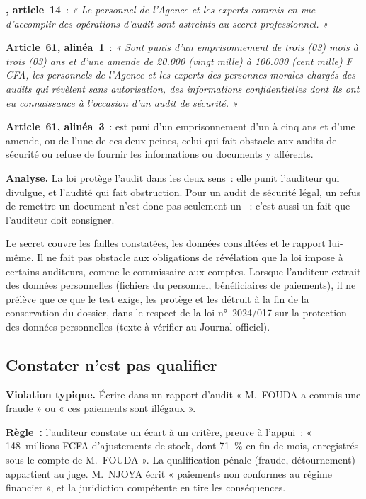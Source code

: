 \begin{boxjuris}
\textbf{, article~14}~: \textit{« Le personnel de
l'Agence et les experts commis en vue d'accomplir des opérations d'audit
sont astreints au secret professionnel. »}

\medskip
\textbf{Article~61, alinéa~1}~: \textit{« Sont punis d'un emprisonnement de
trois (03) mois à trois (03) ans et d'une amende de 20.000 (vingt mille) à
100.000 (cent mille) F CFA, les personnels de l'Agence et les experts des
personnes morales chargés des audits qui révèlent sans autorisation, des
informations confidentielles dont ils ont eu connaissance à l'occasion
d'un audit de sécurité. »}

\medskip
\textbf{Article~61, alinéa~3}~: est puni d'un emprisonnement d'un à cinq
ans et d'une amende, ou de l'une de ces deux peines, celui qui fait
obstacle aux audits de sécurité ou refuse de fournir les informations ou
documents y afférents.

\medskip
\textbf{Analyse.} La loi protège l'audit dans les deux sens~: elle punit
l'auditeur qui divulgue, et l'audité qui fait obstruction. Pour un audit
de sécurité légal, un refus de remettre un document n'est donc pas
seulement un \NEK{}~: c'est aussi un fait que l'auditeur doit consigner.
\end{boxjuris}

Le secret couvre les failles constatées, les données consultées et le
rapport lui-même. Il ne fait pas obstacle aux obligations de révélation
que la loi impose à certains auditeurs, comme le commissaire aux comptes.
Lorsque l'auditeur extrait des données personnelles (fichiers du
personnel, bénéficiaires de paiements), il ne prélève que ce que le test
exige, les protège et les détruit à la fin de la conservation du dossier,
dans le respect de la loi n°~2024/017 sur la protection des données
personnelles (texte à vérifier au Journal officiel).

\subsection{Constater n'est pas qualifier}

\begin{boxalert}
\textbf{Violation typique.} Écrire dans un rapport d'audit « M.~FOUDA a
commis une fraude » ou « ces paiements sont illégaux ».

\smallskip
\textbf{Règle~:} l'auditeur constate un écart à un critère, preuve à
l'appui~: « 148~millions FCFA d'ajustements de stock, dont 71~\% en fin
de mois, enregistrés sous le compte de M.~FOUDA ». La qualification pénale
(fraude, détournement) appartient au juge. M.~NJOYA écrit « paiements non
conformes au régime financier », et la juridiction compétente en tire les
conséquences.
\end{boxalert}

